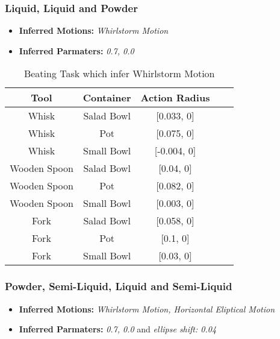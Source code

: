 \subsubsection{Liquid, Liquid and Powder}
\begin{itemize}
    \item \textbf{Inferred Motions:} \textit{Whirlstorm Motion}
    \item \textbf{Inferred Parmaters:} \textit{0.7, 0.0}
\end{itemize}
\begin{table}[H]
    \centering
    \begin{tabular}{|c|c|c|c|c|}
      \hline
      \textbf{Tool} & \textbf{Container} & \textbf{Action Radius}\\
      \hline
      Whisk & Salad Bowl & [0.033, 0] \\
      \hline
      Whisk & Pot & [0.075, 0] \\
      \hline
      Whisk & Small Bowl & [-0.004, 0]\\
      \hline
      Wooden Spoon & Salad Bowl & [0.04, 0] \\
      \hline
      Wooden Spoon & Pot & [0.082, 0] \\
      \hline
      Wooden Spoon & Small Bowl & [0.003, 0] \\
      \hline
      Fork & Salad Bowl & [0.058, 0] \\
      \hline
      Fork & Pot & [0.1, 0] \\
      \hline
      Fork & Small Bowl & [0.03, 0] \\
      \hline
    \end{tabular}
    \caption{Beating Task which infer Whirlstorm Motion}
    
  \end{table}

\subsubsection*{Powder, Semi-Liquid, Liquid and Semi-Liquid}
\begin{itemize}
    \item \textbf{Inferred Motions:} \textit{Whirlstorm Motion, Horizontal Eliptical Motion}
    \item \textbf{Inferred Parmaters:} \textit{0.7, 0.0} and \textit{ellipse shift: 0.04}
\end{itemize}
  
